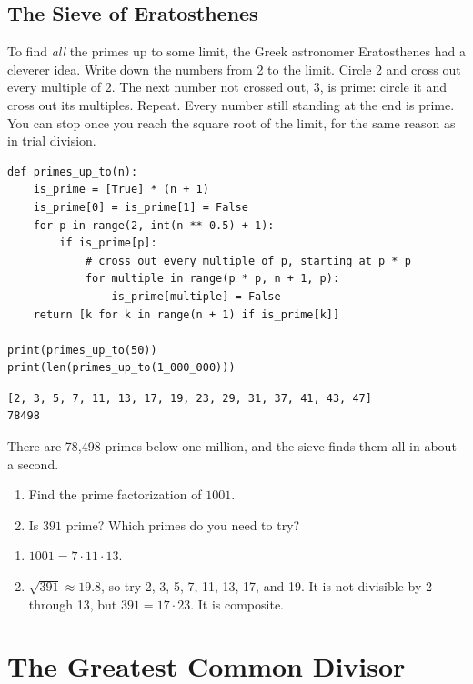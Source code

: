 \subsection{The Sieve of Eratosthenes}
To find \emph{all} the primes up to some limit, the Greek astronomer
Eratosthenes had a cleverer idea. Write down the numbers from 2 to the limit.
Circle 2 and cross out every multiple of 2. The next number not crossed out, 3,
is prime: circle it and cross out its multiples. Repeat. Every number still
standing at the end is prime. You can stop once you reach the square root of
the limit, for the same reason as in trial division.

\begin{verbatim}
def primes_up_to(n):
    is_prime = [True] * (n + 1)
    is_prime[0] = is_prime[1] = False
    for p in range(2, int(n ** 0.5) + 1):
        if is_prime[p]:
            # cross out every multiple of p, starting at p * p
            for multiple in range(p * p, n + 1, p):
                is_prime[multiple] = False
    return [k for k in range(n + 1) if is_prime[k]]

print(primes_up_to(50))
print(len(primes_up_to(1_000_000)))
\end{verbatim}
\begin{verbatim}
[2, 3, 5, 7, 11, 13, 17, 19, 23, 29, 31, 37, 41, 43, 47]
78498
\end{verbatim}
There are 78,498 primes below one million, and the sieve finds them all in
about a second.

\begin{Exercise}[title={Factor and Test}, label=nt_primes]
\begin{enumerate}
\item Find the prime factorization of $1001$.
\item Is $391$ prime? Which primes do you need to try?
\end{enumerate}
\end{Exercise}
\begin{Answer}[ref=nt_primes]
\begin{enumerate}
\item $1001 = 7 \cdot 11 \cdot 13$.
\item $\sqrt{391} \approx 19.8$, so try 2, 3, 5, 7, 11, 13, 17, and 19. It is
not divisible by 2 through 13, but $391 = 17 \cdot 23$. It is composite.
\end{enumerate}
\end{Answer}

\section{The Greatest Common Divisor}

